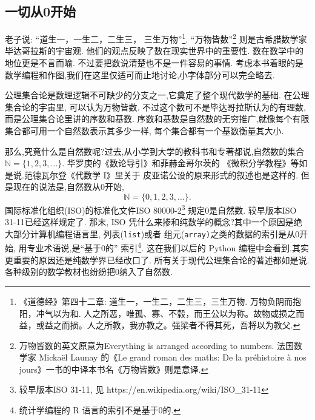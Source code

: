 \documentclass[main.tex]{subfiles}
\begin{document}
\subsection{一切从0开始}\label{chI.1.1}
老子说: “道生一，一生二，二生三，
三生万物”\footnote{《道德经》第四十二章: 道生一，一生二，二生三，三生万物. 万物负阴而抱阳，冲气以为和. 人之所恶，唯孤、寡、不毂，而王公以为称。故物或损之而益，或益之而损。人之所教，我亦教之。强梁者不得其死，吾将以为教父.}.
“万物皆数”\footnote{万物皆数的英文原意为Everything is arranged according to numbers. 
	法国数学家 Mickaël Launay 的《Le grand roman des maths: De la préhistoire à nos jours》一书的中译本书名《万物皆数》则是意译.}
则是古希腊数学家毕达哥拉斯的宇宙观. 他们的观点反映了数在现实世界中的重要性. 数在数学中的地位更是不言而喻.
不过要把数说清楚也不是一件容易的事情. 考虑本书着眼的是数学编程和作图,我们在这里仅适可而止地讨论,小字体部分可以完全略去. 

公理集合论是数理逻辑不可缺少的分支之一,它奠定了整个现代数学的基础. 在公理集合论的宇宙里, 可以认为万物皆数. 
不过这个数可不是毕达哥拉斯认为的有理数, 而是公理集合论里讲的序数和基数.
序数和基数是自然数的无穷推广,就像每个有限集合都可用一个自然数表示其多少一样,
每个集合都有一个基数衡量其大小.

那么,究竟什么是自然数呢?过去,从小学到大学的教科书和专著都说,自然数的集合$\mathbb{N} = \{1, 2, 3, \dots\}$.
华罗庚的《数论导引》\cite{HuaL}和菲赫金哥尔茨的
《微积分学教程》\cite{FeiH1}等如是说.范德瓦尔登《代数学 I》\cite{derWaerden}里关于
皮亚诺公设的原来形式的叙述也是这样的.
但是现在的说法是,自然数从0开始, 
$$\mathbb{N} = \{0,1, 2, 3, \dots\}.$$
 国际标准化组织(ISO)的标准化文件ISO 80000-2\footnote{较早版本ISO 31-11, 见  https://en.wikipedia.org/wiki/ISO\_31-11}
 规定0是自然数. 较早版本ISO 31-11已经这样规定了.
 那末, ISO 凭什么来掺和纯数学的概念?其中一个原因是绝大部分计算机编程语言里,
 列表(\texttt{list})或者
 组元(\texttt{array)}之类的数据的索引是从0开始,
 用专业术语说,是“基于0的”
 索引\footnote{统计学编程的 R 语言的索引不是基于0的.}.
 这在我们以后的 Python 编程中会看到.其实更重要的原因还是纯数学界已经改口了.
 所有关于现代公理集合论的著述都如是说\cite{HalmosP}\cite{KelleyJ}\cite{JiangJi}. 各种级别的数学教材也纷纷把0纳入了自然数.
 
\end{document}
